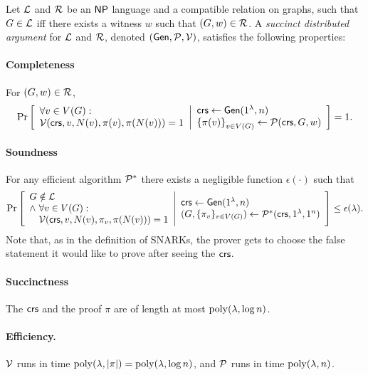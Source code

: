 
\begin{definition}\label{defSDarg}
Let $\mathcal{L}$ and $\mathcal{R}$ be an ${\mathsf{NP}}$ language and a compatible relation on graphs,
such that $G \in \mathcal{L}$ iff there exists a witness $w$ such that $(G,w) \in \mathcal{R}$.
A \emph{succinct distributed argument} for $\mathcal{L}$ and $\mathcal{R}$, denoted $(\mathsf{Gen}, \mathcal{P}, \mathcal{V})$, satisfies the following properties:
\paragraph{Completeness}  For $(G,w)\in \mathcal{R}$,
\begin{gather*}
    \Pr \left[ \begin{array}{ll} 
    	\forall v \in V(G):\\
	    \mathcal{V}(\mathsf{crs}, v, N(v), \pi(v), \pi(N(v))) = 1
	 \end{array} \middle\vert \begin{array}{ll} 
    \mathsf{crs} \leftarrow \mathsf{Gen}(1^\lambda, n) \\
    \left \{{ \pi(v) } \right \}_{v\in V(G)} \leftarrow \mathcal{P}(\mathit{ \mathsf{crs} }, G, w)
     \end{array} \right]
    = 1
    .
\end{gather*}
\paragraph{Soundness}
For any efficient algorithm $\mathcal{P}^*$ %
there exists a negligible function $\epsilon(\cdot)$ such that
\begin{gather*}
    \underset{}{\text{Pr}}\left [
    \begin{array}{ll}
    G\notin \mathcal{L} \\
    \wedge\ \forall v\in V(G) :\\
    \quad \mathcal{V}(\mathit{ \mathsf{crs} }, v, N(v), \pi_{v}, \pi(N(v))) = 1
    \end{array}
    \middle\vert
    \begin{array}{ll}
    \mathit{ \mathsf{crs} } \leftarrow \mathsf{Gen}(1^\lambda, n) \\
    ( G, \{\pi_{v}\}_{v\in V(G)}) \leftarrow \mathcal{P}^*(\mathit{ \mathsf{crs} }, 1^\lambda, 1^n) \\
    \end{array}
    \right ] \leq \epsilon(\lambda)
    .
\end{gather*}
Note that, as in the definition of SNARKs, the prover gets
to choose the false statement it would like to prove after seeing the $\mathsf{crs}$.

\paragraph{Succinctness} The $\mathit{ \mathsf{crs} }$ and the proof $\pi$ are of length at most $\operatorname{poly}(\lambda, \log n)$.
\paragraph{Efficiency.} $\mathcal{V}$ runs in time $\operatorname{poly}(\lambda, |\pi|) = \operatorname{poly}(\lambda, \log n)$,
and $\mathcal{P}$ runs in time $\operatorname{poly}(\lambda, n)$.
\end{definition}
